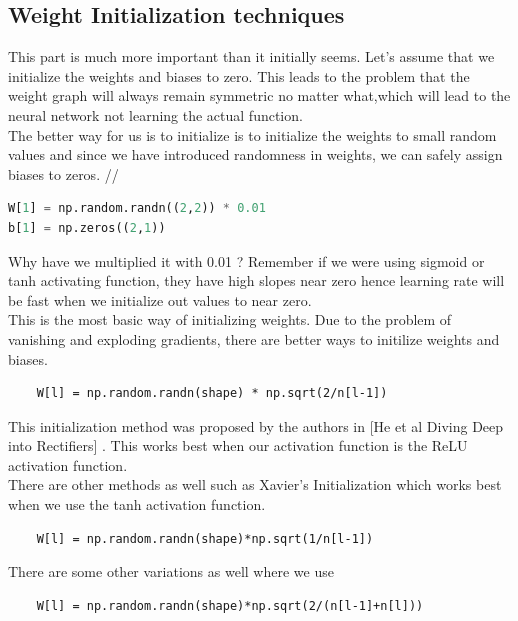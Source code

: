\documentclass[12pt]{article}
\begin{document}
\subsection{Weight Initialization techniques}
This part is much more important than it initially seems. Let's assume that we initialize the weights and biases to zero. This leads to the problem that the weight graph will always remain symmetric no matter what,which will lead to the neural network not learning the actual function. \\ 
The better way for us is to initialize is to initialize the weights to small random values and since we have introduced randomness in weights, we can safely assign biases to zeros. // 
\begin{lstlisting}[language=Python]
W[1] = np.random.randn((2,2)) * 0.01
b[1] = np.zeros((2,1))
\end{lstlisting}
Why have we multiplied it with 0.01 ? Remember if we were using sigmoid or tanh activating function, they have high slopes near zero hence learning rate will be fast when we initialize out values to near zero. \\ 
This is the most basic way of initializing weights. Due to the problem of vanishing and exploding gradients, there are better ways to initilize weights and biases. \\ 
\begin{lstlisting}
    W[l] = np.random.randn(shape) * np.sqrt(2/n[l-1])
\end{lstlisting}
This initialization method was proposed by the authors in [He et al Diving Deep into Rectifiers] . This works best when our activation function is the ReLU activation function. \\ 
There are other methods as well such as Xavier's Initialization which works best when we use the tanh activation function. \\ 
\begin{lstlisting}
    W[l] = np.random.randn(shape)*np.sqrt(1/n[l-1])
\end{lstlisting}
There are some other variations as well where we use 
\begin{lstlisting}
    W[l] = np.random.randn(shape)*np.sqrt(2/(n[l-1]+n[l]))
\end{lstlisting}
\end{document}
